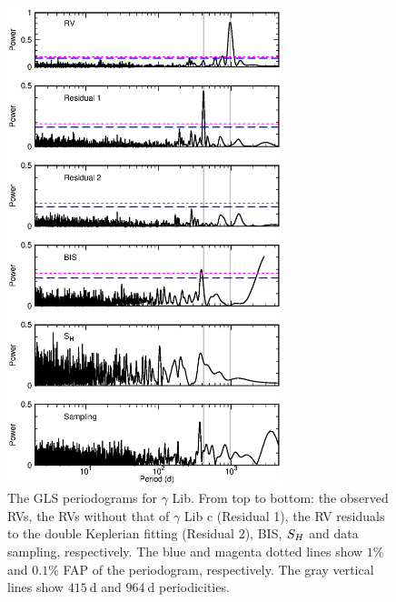 \documentclass[]{pasj01}
\begin{document}
\begin{figure}
\begin{center}
\includegraphics[width=8cm]{peri_138905.eps}
\end{center}
\caption{The GLS periodograms for $\gamma$ Lib. From top to bottom: the observed RVs, the RVs without that of $\gamma$ Lib c (Residual 1), the RV residuals to the double Keplerian fitting (Residual 2), BIS, $S_{\rm H}$ and data sampling, respectively. The blue and magenta dotted lines show $1$\% and $0.1$\% FAP of the periodogram, respectively. The gray vertical lines show $415\>$d and $964\>$d periodicities.}
\label{peri_138905}
\end{figure}
\end{document}
